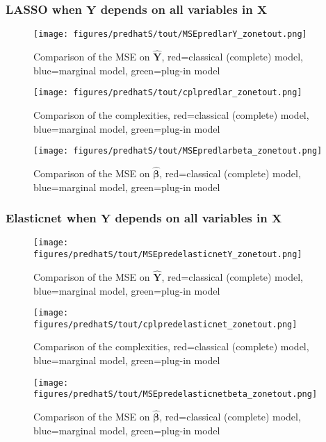 \documentclass[12pt,a4paper]{report}
\begin{document}
\newpage
\subsubsection{LASSO when $\boldsymbol{Y}$ depends on all variables in $\boldsymbol{X}$}

	\begin{figure}[h!]
	\centering
		  \texttt{[image: figures/predhatS/tout/MSEpredlarY\_zonetout.png]}
		\caption{Comparison of the MSE on $\hat{\boldsymbol{Y}}$, red=classical (complete) model, blue=marginal model, green=plug-in model}\label{MSEpredlarY_zonetout}
	\end{figure}
	\begin{figure}[h!]
	\centering
		  \texttt{[image: figures/predhatS/tout/cplpredlar\_zonetout.png]}
		\caption{Comparison of the complexities, red=classical (complete) model, blue=marginal model, green=plug-in model}\label{cplpredlar_zonetout}
	\end{figure}
	\begin{figure}[h!]
	\centering
		  \texttt{[image: figures/predhatS/tout/MSEpredlarbeta\_zonetout.png]}
		\caption{Comparison of the MSE on $\hat{\boldsymbol{\beta}}$, red=classical (complete) model, blue=marginal model, green=plug-in model}\label{MSEpredlarbeta_zonetout}
	\end{figure}
	\FloatBarrier
\newpage
\subsubsection{Elasticnet when $\boldsymbol{Y}$ depends on all variables in $\boldsymbol{X}$}

	\begin{figure}[h!]
	\centering
		  \texttt{[image: figures/predhatS/tout/MSEpredelasticnetY\_zonetout.png]}
		\caption{Comparison of the MSE on $\hat{\boldsymbol{Y}}$, red=classical (complete) model, blue=marginal model, green=plug-in model}\label{MSEpredelasticnetY_zonetout}
	\end{figure}
	\begin{figure}[h!]
	\centering
		  \texttt{[image: figures/predhatS/tout/cplpredelasticnet\_zonetout.png]}
		\caption{Comparison of the complexities, red=classical (complete) model, blue=marginal model, green=plug-in model}\label{cplpredelasticnet_zonetout}
	\end{figure}
	\begin{figure}[h!]
	\centering
		  \texttt{[image: figures/predhatS/tout/MSEpredelasticnetbeta\_zonetout.png]}
		\caption{Comparison of the MSE on $\hat{\boldsymbol{\beta}}$, red=classical (complete) model, blue=marginal model, green=plug-in model}\label{MSEpredelasticnetbeta_zonetout}
	\end{figure}
	\FloatBarrier
\newpage
\end{document}
